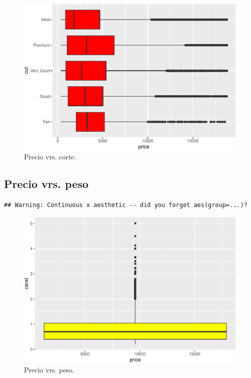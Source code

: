 \documentclass[
]{article}
\begin{document}
\begin{figure}[H]

{\centering \includegraphics[width=0.75\linewidth]{Lab4_files/figure-latex/unnamed-chunk-5-1} 

}

\caption{Precio vrs. corte.}\label{fig:unnamed-chunk-5}
\end{figure}

\hypertarget{precio-vrs.-peso}{%
\subsection{Precio vrs. peso}\label{precio-vrs.-peso}}

\begin{verbatim}
## Warning: Continuous x aesthetic -- did you forget aes(group=...)?
\end{verbatim}

\begin{figure}[H]

{\centering \includegraphics[width=0.75\linewidth]{Lab4_files/figure-latex/unnamed-chunk-6-1} 

}

\caption{Precio vrs. peso.}\label{fig:unnamed-chunk-6}
\end{figure}
\end{document}
